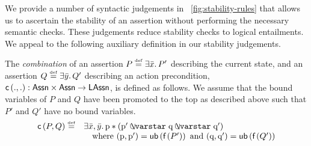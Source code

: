 %
We provide a number of syntactic judgements in \fig~\ref{fig:stability-rules} that allows us to ascertain the stability of an assertion without performing the necessary semantic checks. These judgements reduce stability checks to logical entailments. We appeal to the following auxiliary definition in our stability judgements.
%
\begin{definition}[Combination]
The \emph{combination} of an assertion $P \mathrel{\stackrel{\smash{\scriptscriptstyle{\mathrm{def}}}}{=}} \exists \bar{x}.\,P'$ describing the current state, and an assertion $Q \mathrel{\stackrel{\smash{\scriptscriptstyle{\mathrm{def}}}}{=}} \exists \bar{y}.\,Q'$ describing an action precondition, $\textsf{c}\left(., .\right): \textsf{Assn} \times \textsf{Assn} \rightarrow \textsf{LAssn}$, is defined as follows. We assume that the bound variables of  $P$ and $Q$ have been promoted to the top as described above such that $P'$ and $Q'$ have no bound variables.
%
\[
\begin{array}{l l}
	\combine{P}{Q} \eqdef & \exsts{\bar{x}, \bar{y}} \lass{P} * (\lass{P}' \sepish \lass{Q} \sepish \lass{Q}')\\
	& \quad \text{where } (\lass{P}, \lass{P}') = \ub{\un{P'}} \text{ and }  (\lass{Q}, \lass{Q}') = \ub{\un{Q'}} 
\end{array}
\]
%
\end{definition}
%
%
